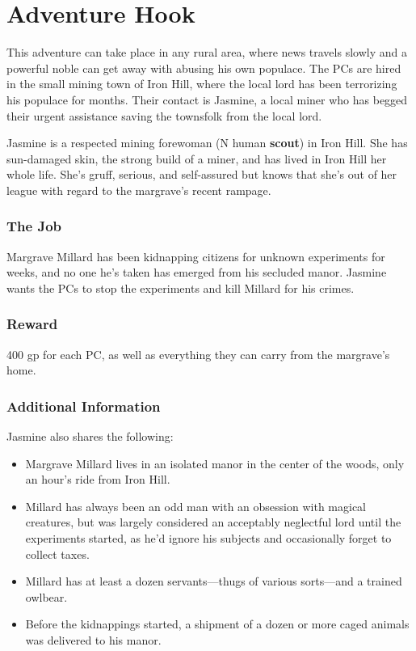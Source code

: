\documentclass[10pt,a4paper,twoside,bg=print,twocolumn,openany,nodeprecatedcode]{dndbook}
\begin{document}
\section{Adventure Hook}
This adventure can take place in any rural area, where news travels slowly and a powerful noble can get away with abusing his own populace. The PCs are hired in the small mining town of Iron Hill, where the local lord has been terrorizing his populace for months. Their contact is Jasmine, a local miner who has begged their urgent assistance saving the townsfolk from the local lord.

Jasmine is a respected mining forewoman (N human \textbf{scout}) in Iron Hill. She has sun-damaged skin, the strong build of a miner, and has lived in Iron Hill her whole life. She's gruff, serious, and self-assured but knows that she's out of her league with regard to the margrave's recent rampage.

\subsubsection{The Job}
Margrave Millard has been kidnapping citizens for unknown experiments for weeks, and no one he's taken has emerged from his secluded manor. Jasmine wants the PCs to stop the experiments and kill Millard for his crimes.

\subsubsection{Reward}
400 gp for each PC, as well as everything they can carry from the margrave's home.

\subsubsection{Additional Information}
Jasmine also shares the following:


\begin{itemize}
\item Margrave Millard lives in an isolated manor in the center of the woods, only an hour's ride from Iron Hill.
\item Millard has always been an odd man with an obsession with magical creatures, but was largely considered an acceptably neglectful lord until the experiments started, as he'd ignore his subjects and occasionally forget to collect taxes.
\item Millard has at least a dozen servants—thugs of various sorts—and a trained owlbear.
\item Before the kidnappings started, a shipment of a dozen or more caged animals was delivered to his manor.
\end{itemize}
\end{document}
